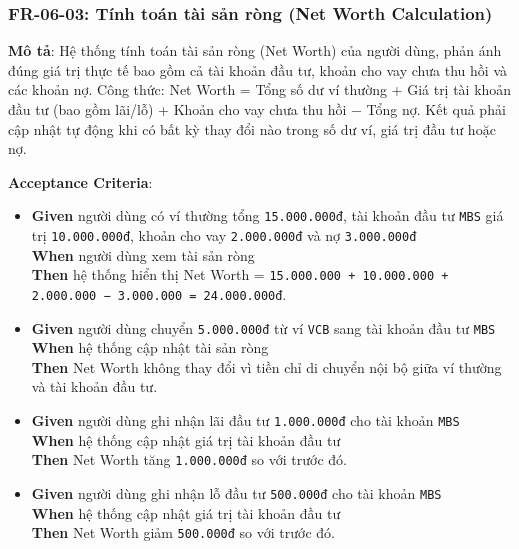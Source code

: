 \subsubsection{FR-06-03: Tính toán tài sản ròng (Net Worth Calculation)}

\textbf{Mô tả}: Hệ thống tính toán tài sản ròng (Net Worth) của người dùng, phản ánh đúng giá trị thực tế bao gồm cả tài khoản đầu tư, khoản cho vay chưa thu hồi và các khoản nợ. Công thức: Net Worth = Tổng số dư ví thường + Giá trị tài khoản đầu tư (bao gồm lãi/lỗ) + Khoản cho vay chưa thu hồi − Tổng nợ. Kết quả phải cập nhật tự động khi có bất kỳ thay đổi nào trong số dư ví, giá trị đầu tư hoặc nợ.



\textbf{Acceptance Criteria}:

\begin{itemize}
\item \textbf{Given} người dùng có ví thường tổng \texttt{15.000.000đ}, tài khoản đầu tư \texttt{MBS} giá trị \texttt{10.000.000đ}, khoản cho vay \texttt{2.000.000đ} và nợ \texttt{3.000.000đ}  \\ \hspace*{1.5em}  \textbf{When} người dùng xem tài sản ròng  \\ \hspace*{1.5em}  \textbf{Then} hệ thống hiển thị Net Worth = \texttt{15.000.000 + 10.000.000 + 2.000.000 − 3.000.000 = 24.000.000đ}.
\item \textbf{Given} người dùng chuyển \texttt{5.000.000đ} từ ví \texttt{VCB} sang tài khoản đầu tư \texttt{MBS}  \\ \hspace*{1.5em}  \textbf{When} hệ thống cập nhật tài sản ròng  \\ \hspace*{1.5em}  \textbf{Then} Net Worth không thay đổi vì tiền chỉ di chuyển nội bộ giữa ví thường và tài khoản đầu tư.
\item \textbf{Given} người dùng ghi nhận lãi đầu tư \texttt{1.000.000đ} cho tài khoản \texttt{MBS}  \\ \hspace*{1.5em}  \textbf{When} hệ thống cập nhật giá trị tài khoản đầu tư  \\ \hspace*{1.5em}  \textbf{Then} Net Worth tăng \texttt{1.000.000đ} so với trước đó.
\item \textbf{Given} người dùng ghi nhận lỗ đầu tư \texttt{500.000đ} cho tài khoản \texttt{MBS}  \\ \hspace*{1.5em}  \textbf{When} hệ thống cập nhật giá trị tài khoản đầu tư  \\ \hspace*{1.5em}  \textbf{Then} Net Worth giảm \texttt{500.000đ} so với trước đó.

\end{itemize}
